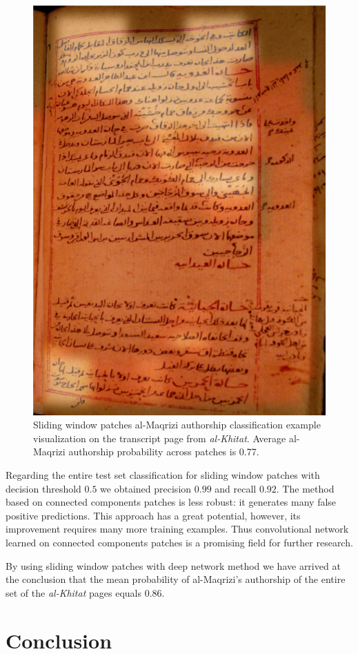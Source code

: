 \documentclass[conference,a4paper,twocolumn]{IEEEtran}
\begin{document}
\begin{figure}[!b]
	\centering
  \includegraphics[width=0.49\linewidth]{figures/hitat_15_fixed.png}
   \caption{Sliding window patches al-Maqrizi authorship classification example visualization on the transcript page from {\it al-Khitat}. Average al-Maqrizi authorship probability across patches is 0.77.}
	\label{fig:al_maqrizi_classification_example_test_hitat}
\end{figure}

Regarding the entire test set classification for sliding window patches with decision threshold $0.5$ we obtained precision $0.99$ and recall $0.92$. The method based on connected components patches is less robust: it generates many false positive predictions. This approach has a great potential, however, its improvement requires many more training examples. Thus convolutional network learned on connected components patches is a promising field for further research.

By using sliding window patches with deep network method we have arrived at the conclusion that the mean probability of al-Maqrizi's authorship  of the entire set of the {\it al-Khitat} pages equals $0.86$.    

\section{Conclusion}
\end{document}
